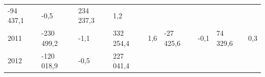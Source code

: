 \begin{longtable}[]{@{}lllllllll@{}}
\begin{minipage}[t]{0.12\columnwidth}
-94 437,1\strut
\end{minipage} & \begin{minipage}[t]{0.06\columnwidth}\raggedright
-0,5\strut
\end{minipage} & \begin{minipage}[t]{0.08\columnwidth}\raggedright
234 237,3\strut
\end{minipage} & \begin{minipage}[t]{0.06\columnwidth}\raggedright
1,2\strut
\end{minipage}\tabularnewline
\begin{minipage}[t]{0.05\columnwidth}\raggedright
2011\strut
\end{minipage} & \begin{minipage}[t]{0.10\columnwidth}\raggedright
-230 499,2\strut
\end{minipage} & \begin{minipage}[t]{0.06\columnwidth}\raggedright
-1,1\strut
\end{minipage} & \begin{minipage}[t]{0.17\columnwidth}\raggedright
332 254,4\strut
\end{minipage} & \begin{minipage}[t]{0.06\columnwidth}\raggedright
1,6\strut
\end{minipage} & \begin{minipage}[t]{0.12\columnwidth}\raggedright
-27 425,6\strut
\end{minipage} & \begin{minipage}[t]{0.06\columnwidth}\raggedright
-0,1\strut
\end{minipage} & \begin{minipage}[t]{0.08\columnwidth}\raggedright
74 329,6\strut
\end{minipage} & \begin{minipage}[t]{0.06\columnwidth}\raggedright
0,3\strut
\end{minipage}\tabularnewline
\begin{minipage}[t]{0.05\columnwidth}\raggedright
2012\strut
\end{minipage} & \begin{minipage}[t]{0.10\columnwidth}\raggedright
-120 018,9\strut
\end{minipage} & \begin{minipage}[t]{0.06\columnwidth}\raggedright
-0,5\strut
\end{minipage} & \begin{minipage}[t]{0.17\columnwidth}\raggedright
227 041,4\strut

\end{minipage}
\end{longtable}
